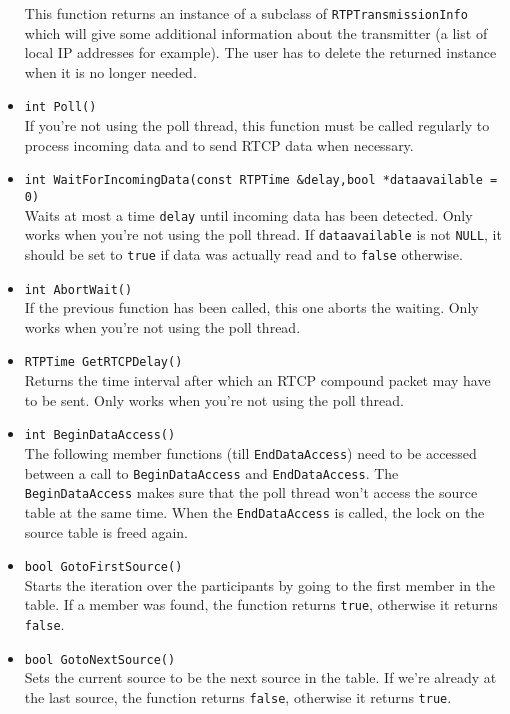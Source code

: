 \documentclass[12pt,a4paper]{article}
\begin{document}
\begin{itemize}
					    This function returns an instance of a subclass of {\tt RTPTransmissionInfo}
						which will give some additional information about the transmitter
						(a list of local IP addresses for example). The user
						has to delete the returned instance when it is no longer needed.
					\item {\tt int Poll()}\\
						If you're not using the poll thread, this function
						must be called regularly to process incoming data
						and to send RTCP data when necessary.
					\item {\tt int WaitForIncomingData(const RTPTime \&delay,bool *dataavailable = 0)}\\
						Waits at most a time {\tt delay} until incoming data has
						been detected. Only works when you're not using the poll
						thread. If {\tt dataavailable} is not {\tt NULL}, it should
						be set to {\tt true} if data was actually read and to {\tt false}
						otherwise.
					\item {\tt int AbortWait()}\\
						If the previous function has been called, this one aborts
						the waiting. Only works when you're not using the poll
						thread.
					\item {\tt RTPTime GetRTCPDelay()}\\
						Returns the time interval after which an RTCP compound
						packet may have to be sent. Only works when you're not using
						the poll thread.
					\item {\tt int BeginDataAccess()}\\
						The following member functions (till {\tt EndDataAccess})
						need to be accessed between a call to {\tt BeginDataAccess}
						and {\tt EndDataAccess}. The {\tt BeginDataAccess} makes
						sure that the poll thread won't access the source table
						at the same time. When the {\tt EndDataAccess} is called,
						the lock on the source table is freed again.
					\item {\tt bool GotoFirstSource()}\\
						Starts the iteration over the participants by going to the
						first member in the table. If a member was found, the function
						returns {\tt true}, otherwise it returns {\tt false}.
					\item {\tt bool GotoNextSource()}\\
						Sets the current source to be the next source in the table.
						If we're already at the last source, the function returns
						{\tt false}, otherwise it returns {\tt true}.

\end{itemize}
\end{document}

